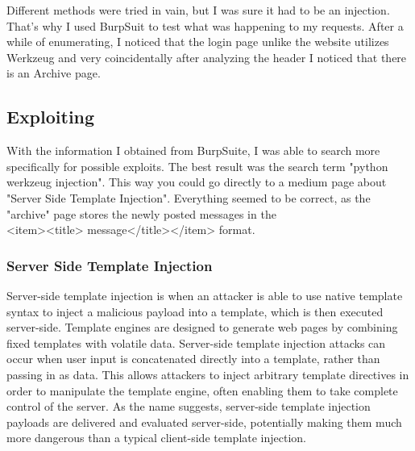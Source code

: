 \documentclass[../main.tex]{subfiles}
\begin{document}
Different methods were tried in vain, but I was sure it had to be an injection.\\
That's why I used BurpSuit to test what was happening to my requests. After a while of enumerating, I noticed that the login page unlike the website utilizes Werkzeug and very coincidentally after analyzing the header I noticed that there is an Archive page.

\begin{figure}[!h]
  \centering
  \hfill
\end{figure}

\clearpage
\subsection{Exploiting}

With the information I obtained from BurpSuite, I was able to search more specifically for possible exploits. The best result was the search term "python werkzeug injection". This way you could go directly to a medium page about "Server Side Template Injection". Everything seemed to be correct, as the "archive" page stores the newly posted messages in the \\
<item><title> message</title></item> format.

\subsubsection{Server Side Template Injection}

Server-side template injection is when an attacker is able to use native template syntax to inject a malicious payload into a template, which is then executed server-side.
Template engines are designed to generate web pages by combining fixed templates with volatile data. Server-side template injection attacks can occur when user input is concatenated directly into a template, rather than passing in as data. This allows attackers to inject arbitrary template directives in order to manipulate the template engine, often enabling them to take complete control of the server. As the name suggests, server-side template injection payloads are delivered and evaluated server-side, potentially making them much more dangerous than a typical client-side template injection. 
\end{document}
